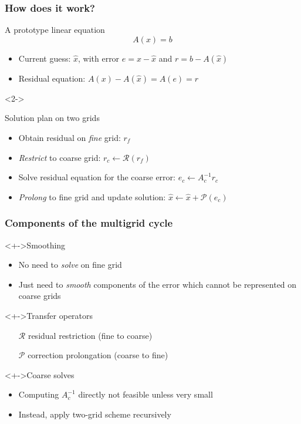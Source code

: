 \documentclass[presentation]{beamer}
\begin{document}
\begin{frame}
  \frametitle{How does it work?}
  \begin{block}{A prototype linear equation}
    \begin{equation*}
      A(x) = b
    \end{equation*}
    \begin{itemize}
    \item Current guess: $\hat{x}$, with error $e = x - \hat{x}$ and 
      $r = b - A(\hat{x})$
    \item Residual equation: $A(x) - A(\hat{x}) = A(e) = r$
    \end{itemize}
  \end{block}
  \begin{visibleenv}<2->
    \begin{block}{Solution plan on two grids}
      \begin{itemize}[<+(1)->]
      \item Obtain residual on \emph{fine} grid: $r_f$
      \item \emph{Restrict} to coarse grid:
        $r_c \leftarrow \mathcal{R}(r_f)$
      \item Solve residual equation for the coarse error:
        $e_c \leftarrow A_c^{-1} r_c$
      \item \emph{Prolong} to fine grid and update solution:
        $\hat{x} \leftarrow \hat{x} + \mathcal{P}(e_c)$
      \end{itemize}
    \end{block}
  \end{visibleenv}
\end{frame}

\begin{frame}
  \frametitle{Components of the multigrid cycle}

  \begin{block}<+->{Smoothing}
    \begin{itemize}
    \item No need to \emph{solve} on fine grid
    \item Just need to \emph{smooth} components of the error which cannot
      be represented on coarse grids
    \end{itemize}
  \end{block}
  \begin{block}<+->{Transfer operators}
    \begin{itemize}
    \item [$\mathcal{R}$] residual restriction (fine to coarse)
    \item [$\mathcal{P}$] correction prolongation (coarse to fine)
    \end{itemize}
  \end{block}
  \begin{block}<+->{Coarse solves}
    \begin{itemize}
    \item Computing $A_c^{-1}$ directly not feasible unless very small
    \item Instead, apply two-grid scheme recursively
    \end{itemize}
  \end{block}
\end{frame}
\end{document}
